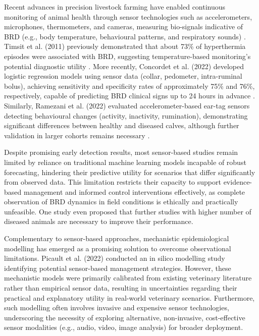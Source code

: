 Recent advances in precision livestock farming
\cite{Berckmans2014, Allain2014} have enabled continuous monitoring of animal health through sensor technologies such as accelerometers, microphones, thermometers, and cameras, measuring bio-signals indicative of BRD (e.g., body temperature, behavioural patterns, and respiratory sounds) \cite{Guatteo2015}. Timsit et al. (2011) previously demonstrated that about 73\% of hyperthermia episodes were associated with BRD, suggesting temperature-based monitoring's potential diagnostic utility \cite{timsit_early_2011}. More recently, Concordet et al. (2022) developed logistic regression models using sensor data (collar, pedometer, intra-ruminal bolus), achieving sensitivity and specificity rates of approximately 75\% and 76\%, respectively, capable of predicting BRD clinical signs up to 24 hours in advance \cite{Concordet2022}. Similarly, Ramezani et al. (2022) evaluated accelerometer-based ear-tag sensors detecting behavioural changes (activity, inactivity, rumination), demonstrating significant differences between healthy and diseased calves, although further validation in larger cohorts remains necessary \cite{ani12091093}.

Despite promising early detection results, most sensor-based studies remain limited by reliance on traditional machine learning models incapable of robust forecasting, hindering their predictive utility for scenarios that differ significantly from observed data. This limitation restricts their capacity to support evidence-based management and informed control interventions effectively, as complete observation of BRD dynamics in field conditions is ethically and practically unfeasible. One study even proposed that further studies with higher number of diseased animals are necessary to improve their performance. 

Complementary to sensor-based approaches, mechanistic epidemiological modelling has emerged as a promising solution to overcome observational limitations. Picault et al. (2022) \cite{picault_modelling_2022} conducted an in silico modelling study identifying potential sensor-based management strategies. However, these mechanistic models were primarily calibrated from existing veterinary literature rather than empirical sensor data, resulting in uncertainties regarding their practical and explanatory utility in real-world veterinary scenarios. Furthermore, such modelling often involves invasive and expensive sensor technologies, underscoring the necessity of exploring alternative, non-invasive, cost-effective sensor modalities (e.g., audio, video, image analysis) for broader deployment.

